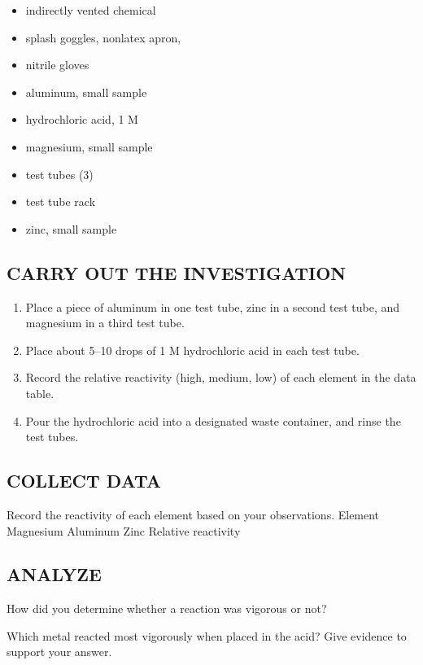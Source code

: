 \documentclass[a4paper,12pt]{exam}
\begin{document}
 \begin{itemize}
    


    \item  indirectly vented chemical
    \item splash goggles, nonlatex apron,
    \item nitrile gloves
    \item aluminum, small sample
    \item hydrochloric acid, 1 M
    \item magnesium, small sample
    \item test tubes (3)
    \item test tube rack
    \item zinc, small sample

\end{itemize}

 \subsection*{CARRY OUT THE INVESTIGATION}

 \begin{enumerate}

\item Place a piece of aluminum in one test tube, zinc in a second test tube, and magnesium in a third test tube.
\item Place about 5–10 drops of 1 M hydrochloric acid in each test tube.
\item Record the relative reactivity (high, medium, low) of each element in the data table.
\item Pour the hydrochloric acid into a designated waste container, and rinse the test tubes.

\end{enumerate}

\subsection*{COLLECT DATA}

Record the reactivity of each element based on your observations.
Element Magnesium Aluminum Zinc
Relative reactivity

\subsection*{ANALYZE}

\begin{questions}
    
\question How did you determine whether a reaction was vigorous or not?

\fillwithlines{1in}

\question Which metal reacted most vigorously when placed in the acid? Give evidence to support your
answer.


\fillwithlines{1in}

\end{questions}
\end{document}

